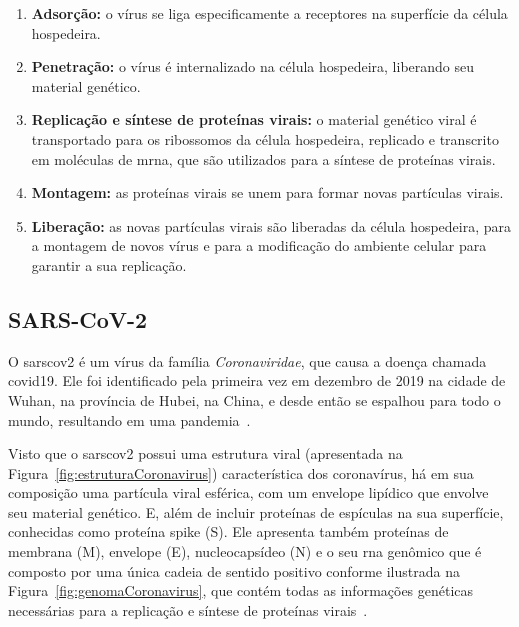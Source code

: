 \begin{enumerate}
  \item \textbf{Adsorção:} o vírus se liga especificamente a receptores na superfície da célula hospedeira.
  \item \textbf{Penetração:} o vírus é internalizado na célula hospedeira, liberando seu material genético.
  \item \textbf{Replicação e síntese de proteínas virais:} o material genético viral é transportado para os ribossomos da célula hospedeira, replicado e transcrito em moléculas de \gls{mrna}, que são utilizados para a síntese de proteínas virais.
  \item \textbf{Montagem:} as proteínas virais se unem para formar novas partículas virais.
  \item \textbf{Liberação:} as novas partículas virais são liberadas da célula hospedeira, para a montagem de novos vírus e para a modificação do ambiente celular para garantir a sua replicação.
\end{enumerate}

\subsection{SARS-CoV-2}

O \gls{sarscov2} é um vírus da família \textit{Coronaviridae}, que causa a doença chamada \gls{covid19}. Ele foi identificado pela primeira vez em dezembro de 2019 na cidade de Wuhan, na província de Hubei, na China, e desde então se espalhou para todo o mundo, resultando em uma pandemia~\cite{zhu_novel_2020,wu_coronavirus_2020}.

Visto que o \gls{sarscov2} possui uma estrutura viral (apresentada na Figura~\ref{fig:estruturaCoronavirus}) característica dos coronavírus, há em sua composição uma partícula viral esférica, com um envelope lipídico que envolve seu material genético. E, além de incluir proteínas de espículas na sua superfície, conhecidas como proteína spike (S). Ele apresenta também proteínas de membrana (M), envelope (E), nucleocapsídeo (N) e o seu \gls{rna} genômico que é composto por uma única cadeia de sentido positivo conforme ilustrada na Figura~\ref{fig:genomaCoronavirus}, que contém todas as informações genéticas necessárias para a replicação e síntese de proteínas virais~\cite{covid19_cascella_2020}.

